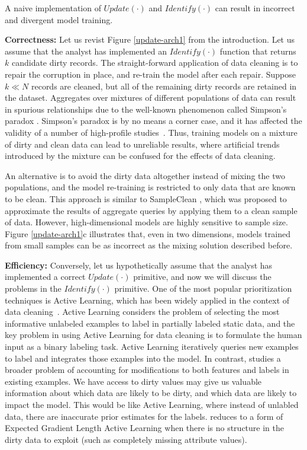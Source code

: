 A naive implementation of $Update(\cdot)$ and $Identify(\cdot)$ can result in incorrect and divergent model training.

\vspace{0.5em}
\noindent \textbf{Correctness: } Let us revist Figure \ref{update-arch1} from the introduction. Let us assume that the analyst has implemented an $Identify(\cdot)$ function that returns $k$ candidate dirty records.
The straight-forward application of data cleaning is to repair the corruption in place, and re-train the model after each repair.
Suppose $k \ll N$ records are cleaned, but all of the remaining dirty records are retained in the dataset.
Aggregates over mixtures of different populations of data can result in spurious relationships due to the well-known phenomenon called Simpson's paradox \cite{simpson1951interpretation}.
Simpson's paradox is by no means a corner case, and it has affected the validity of a number of high-profile studies~\cite{simpsonsparadox}.
Thus, training models on a mixture of dirty and clean data can lead to unreliable results, where artificial trends introduced by the mixture can be confused for the effects of data cleaning.

An alternative is to avoid the dirty data altogether instead of mixing the two populations, and the model re-training is restricted to only data that are known to be clean.
This approach is similar to SampleClean \cite{wang1999sample}, which was proposed to approximate the results of aggregate queries by applying them to a clean sample of data.
However, high-dimensional models are highly sensitive to sample size.
Figure \ref{update-arch1}c illustrates that, even in two dimensions, models trained from small samples can be as incorrect as the mixing solution described before.

\vspace{0.5em} 

\noindent \textbf{Efficiency: } Conversely, let us hypothetically assume that the analyst has implemented a correct $Update(\cdot)$ primitive, and now we will discuss the problems in the $Identify(\cdot)$ primitive.
One of the most popular prioritization techniques is Active Learning, which has been widely applied in the context of data cleaning~\cite{DBLP:journals/pvldb/YakoutENOI11,gokhale2014corleone}.
Active Learning considers the problem of selecting the most informative unlabeled examples to label in partially labeled static data, and the key problem in using Active Learning for data cleaning is to formulate the human input as a binary labeling task.
Active Learning iteratively queries new examples to label and integrates those examples into the model.
In contrast, \sys studies a broader problem of accounting for modifications to both features and labels in existing examples.
We have access to dirty values may give us valuable information about which data are likely to be dirty, and which data are likely to impact the model. 
This would be like Active Learning, where instead of unlabled data, there are inaccurate prior estimates for the labels.
\sys reduces to a form of Expected Gradient Length Active Learning when there is no structure in the dirty data to exploit (such as completely missing attribute values).




